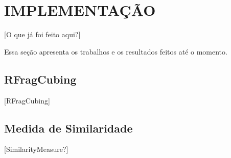 
\chapter{IMPLEMENTAÇÃO}

[O que já foi feito aqui?]

Essa seção apresenta os trabalhos e os resultados feitos até o momento.

\section{RFragCubing}

[RFragCubing]

\section{Medida de Similaridade}

[SimilarityMeasure?]


